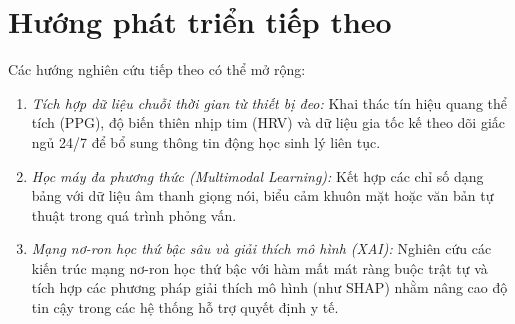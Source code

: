 \section{Hướng phát triển tiếp theo}
\label{sec:huong-phat-trien}

Các hướng nghiên cứu tiếp theo có thể mở rộng:
\begin{enumerate}
    \item \textit{Tích hợp dữ liệu chuỗi thời gian từ thiết bị đeo:} Khai thác tín hiệu quang thể tích (PPG), độ biến thiên nhịp tim (HRV) và dữ liệu gia tốc kế theo dõi giấc ngủ 24/7 để bổ sung thông tin động học sinh lý liên tục.
    \item \textit{Học máy đa phương thức (Multimodal Learning):} Kết hợp các chỉ số dạng bảng với dữ liệu âm thanh giọng nói, biểu cảm khuôn mặt hoặc văn bản tự thuật trong quá trình phỏng vấn.
    \item \textit{Mạng nơ-ron học thứ bậc sâu và giải thích mô hình (XAI):} Nghiên cứu các kiến trúc mạng nơ-ron học thứ bậc với hàm mất mát ràng buộc trật tự và tích hợp các phương pháp giải thích mô hình (như SHAP) nhằm nâng cao độ tin cậy trong các hệ thống hỗ trợ quyết định y tế.
\end{enumerate}

